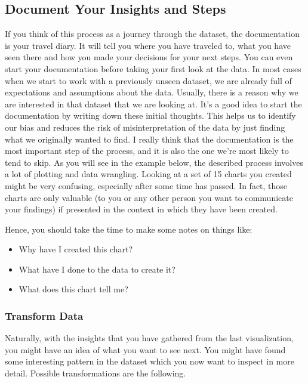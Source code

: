 \documentclass[]{book}
\providecommand{\tightlist}{%
  \setlength{\itemsep}{0pt}\setlength{\parskip}{0pt}}
\theoremstyle{definition}
\theoremstyle{definition}
\theoremstyle{definition}
\theoremstyle{remark}
\begin{document}
\subsection{Document Your Insights and
Steps}\label{document-your-insights-and-steps}

If you think of this process as a journey through the dataset, the
documentation is your travel diary. It will tell you where you have
traveled to, what you have seen there and how you made your decisions
for your next steps. You can even start your documentation before taking
your first look at the data. In most cases when we start to work with a
previously unseen dataset, we are already full of expectations and
assumptions about the data. Usually, there is a reason why we are
interested in that dataset that we are looking at. It's a good idea to
start the documentation by writing down these initial thoughts. This
helps us to identify our bias and reduces the risk of misinterpretation
of the data by just finding what we originally wanted to find. I really
think that the documentation is the most important step of the process,
and it is also the one we're most likely to tend to skip. As you will
see in the example below, the described process involves a lot of
plotting and data wrangling. Looking at a set of 15 charts you created
might be very confusing, especially after some time has passed. In fact,
those charts are only valuable (to you or any other person you want to
communicate your findings) if presented in the context in which they
have been created.

Hence, you should take the time to make some notes on things like:

\begin{itemize}
\tightlist
\item
  Why have I created this chart?
\item
  What have I done to the data to create it?
\item
  What does this chart tell me?
\end{itemize}

\subsubsection{Transform Data}\label{transform-data}

Naturally, with the insights that you have gathered from the last
visualization, you might have an idea of what you want to see next. You
might have found some interesting pattern in the dataset which you now
want to inspect in more detail. Possible transformations are the
following.
\end{document}
